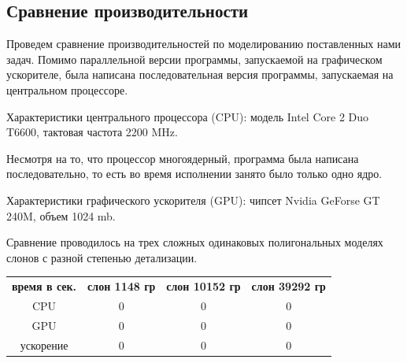 \subsection*{Сравнение производительности}

Проведем сравнение производительностей по моделированию поставленных нами задач. Помимо параллельной версии программы, запускаемой на графическом ускорителе, была написана последовательная версия программы, запускаемая на центральном процессоре.  

Характеристики центрального процессора (CPU): модель Intel Core 2 Duo T6600, тактовая частота 2200 MHz. 

Несмотря на то, что процессор многоядерный, программа была написана последовательно, то есть во время исполнении занято было только одно ядро.

Характеристики графического ускорителя (GPU): чипсет Nvidia GeForse GT 240M, объем 1024 mb.

Сравнение проводилось на трех сложных одинаковых полигональных моделях слонов с разной степенью детализации.

\begin{center}
\begin{tabular}{cccc}
\textbf{время в сек.}		& \textbf{слон 1148 гр} 			& \textbf{слон 10152 гр}		& \textbf{слон 39292 гр} 		\\
CPU 							& 0					 				& 0									& 0			 						\\
GPU 							& 0									& 0 									& 0									\\
ускорение 					& 0									& 0									& 0 									\\
\end{tabular}
\end{center}







